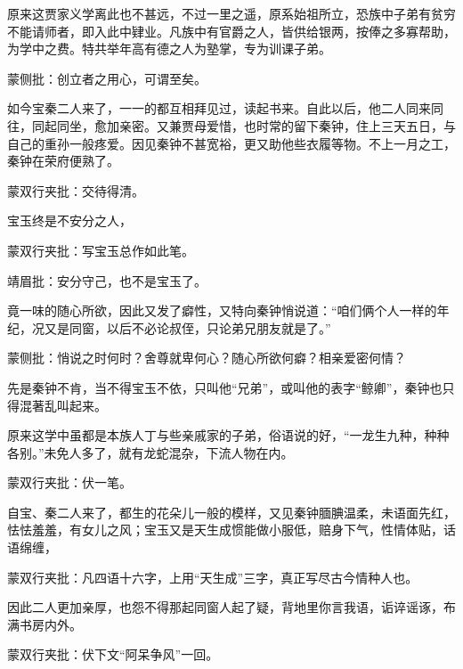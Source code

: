 \begin{parag}
    原来这贾家义学离此也不甚远，不过一里之遥，原系始祖所立，恐族中子弟有贫穷不能请师者，即入此中肄业。凡族中有官爵之人，皆供给银两，按俸之多寡帮助，为学中之费。特共举年高有德之人为塾掌，专为训课子弟。\begin{note}蒙侧批：创立者之用心，可谓至矣。\end{note}如今宝秦二人来了，一一的都互相拜见过，读起书来。自此以后，他二人同来同往，同起同坐，愈加亲密。又兼贾母爱惜，也时常的留下秦钟，住上三天五日，与自己的重孙一般疼爱。因见秦钟不甚宽裕，更又助他些衣履等物。不上一月之工，秦钟在荣府便熟了。\begin{note}蒙双行夹批：交待得清。\end{note}宝玉终是不安分之人，\begin{note}蒙双行夹批：写宝玉总作如此笔。\end{note}\begin{note}靖眉批：安分守己，也不是宝玉了。\end{note}竟一味的随心所欲，因此又发了癖性，又特向秦钟悄说道：“咱们俩个人一样的年纪，况又是同窗，以后不必论叔侄，只论弟兄朋友就是了。”\begin{note}蒙侧批：悄说之时何时？舍尊就卑何心？随心所欲何癖？相亲爱密何情？\end{note}先是秦钟不肯，当不得宝玉不依，只叫他“兄弟”，或叫他的表字“鲸卿”，秦钟也只得混著乱叫起来。
\end{parag}

\begin{parag}

    原来这学中虽都是本族人丁与些亲戚家的子弟，俗语说的好，“一龙生九种，种种各别。”未免人多了，就有龙蛇混杂，下流人物在内。\begin{note}蒙双行夹批：伏一笔。\end{note}自宝、秦二人来了，都生的花朵儿一般的模样，又见秦钟腼腆温柔，未语面先红，怯怯羞羞，有女儿之风；宝玉又是天生成惯能做小服低，赔身下气，性情体贴，话语绵缠，\begin{note}蒙双行夹批：凡四语十六字，上用“天生成”三字，真正写尽古今情种人也。\end{note}因此二人更加亲厚，也怨不得那起同窗人起了疑，背地里你言我语，诟谇谣诼，布满书房内外。\begin{note}蒙双行夹批：伏下文“阿呆争风”一回。\end{note}
\end{parag}


